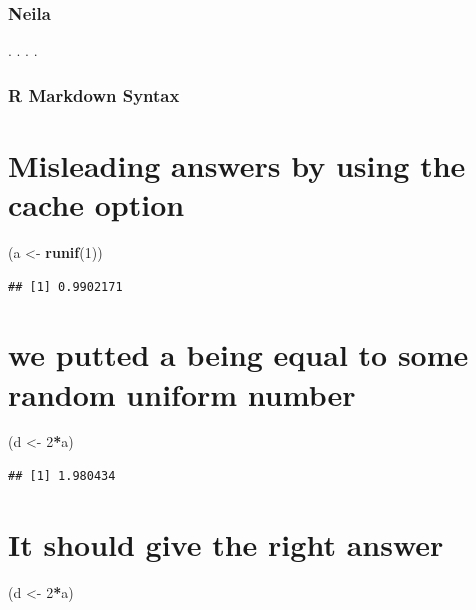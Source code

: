 \documentclass[]{article}
\newenvironment{Shaded}{\begin{snugshade}}{\end{snugshade}}
\newcommand{\KeywordTok}[1]{\textcolor[rgb]{0.13,0.29,0.53}{\textbf{#1}}}
\newcommand{\DecValTok}[1]{\textcolor[rgb]{0.00,0.00,0.81}{#1}}
\newcommand{\StringTok}[1]{\textcolor[rgb]{0.31,0.60,0.02}{#1}}
\newcommand{\OperatorTok}[1]{\textcolor[rgb]{0.81,0.36,0.00}{\textbf{#1}}}
\newcommand{\NormalTok}[1]{#1}
\begin{document}
\subsubsection{Neila}\label{neila}

. . . .

\subsubsection{R Markdown Syntax}\label{r-markdown-syntax}

\section{Misleading answers by using the cache
option}\label{misleading-answers-by-using-the-cache-option}

\begin{Shaded}
\begin{Highlighting}[]
\NormalTok{(a <-}\StringTok{ }\KeywordTok{runif}\NormalTok{(}\DecValTok{1}\NormalTok{))}
\end{Highlighting}
\end{Shaded}

\begin{verbatim}
## [1] 0.9902171
\end{verbatim}

\section{we putted a being equal to some random uniform
number}\label{we-putted-a-being-equal-to-some-random-uniform-number}

\begin{Shaded}
\begin{Highlighting}[]
\NormalTok{(d <-}\StringTok{ }\DecValTok{2}\OperatorTok{*}\NormalTok{a)}
\end{Highlighting}
\end{Shaded}

\begin{verbatim}
## [1] 1.980434
\end{verbatim}

\section{It should give the right
answer}\label{it-should-give-the-right-answer}

\begin{Shaded}
\begin{Highlighting}[]
\NormalTok{(d <-}\StringTok{ }\DecValTok{2}\OperatorTok{*}\NormalTok{a)}
\end{Highlighting}
\end{Shaded}
\end{document}
